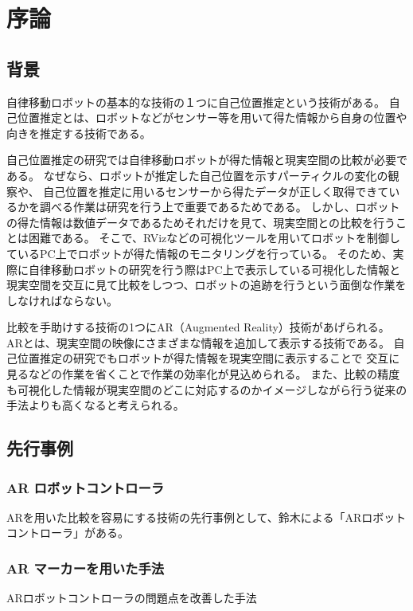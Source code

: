 \chapter{序論}

\section{背景}
自律移動ロボットの基本的な技術の１つに自己位置推定という技術がある。
自己位置推定とは、ロボットなどがセンサー等を用いて得た情報から自身の位置や向きを推定する技術である。

自己位置推定の研究では自律移動ロボットが得た情報と現実空間の比較が必要である。
なぜなら、ロボットが推定した自己位置を示すパーティクルの変化の観察や、
自己位置を推定に用いるセンサーから得たデータが正しく取得できているかを調べる作業は研究を行う上で重要であるためである。
しかし、ロボットの得た情報は数値データであるためそれだけを見て、現実空間との比較を行うことは困難である。
そこで、RVizなどの可視化ツールを用いてロボットを制御しているPC上でロボットが得た情報のモニタリングを行っている。
そのため、実際に自律移動ロボットの研究を行う際はPC上で表示している可視化した情報と
現実空間を交互に見て比較をしつつ、ロボットの追跡を行うという面倒な作業をしなければならない。

比較を手助けする技術の1つにAR（Augmented Reality）技術があげられる。
ARとは、現実空間の映像にさまざまな情報を追加して表示する技術である。
自己位置推定の研究でもロボットが得た情報を現実空間に表示することで
交互に見るなどの作業を省くことで作業の効率化が見込められる。
また、比較の精度も可視化した情報が現実空間のどこに対応するのかイメージしながら行う従来の手法よりも高くなると考えられる。


\section{先行事例}

\subsection{AR ロボットコントローラ}
ARを用いた比較を容易にする技術の先行事例として、鈴木による「ARロボットコントローラ」\cite{鈴木勇矢2019ARロボットコントローラ}がある。


\subsection{AR マーカーを用いた手法}
ARロボットコントローラの問題点を改善した手法


